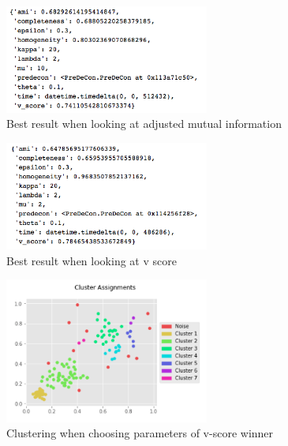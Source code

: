\documentclass[a4paper]{article}
\begin{document}
\begin{figure}[ht]
	\label{fig:ami_dict}
	\centering
	\includegraphics[width=0.6\textwidth]{ami_dict.png}
	\caption{Best result when looking at adjusted mutual information}
\end{figure}

\begin{figure}[ht]
	\centering
	\includegraphics[width=0.6\textwidth]{v_score_dict.png}
	\caption{Best result when looking at v score}
    \label{fig:v_score_dict}
\end{figure}

\begin{figure}[ht]
	\centering
	\includegraphics[width=0.6\textwidth]{v_score_graph.png}
	\caption{Clustering when choosing parameters of v-score winner}
    \label{fig:v_score_graph}
\end{figure}
\end{document}

